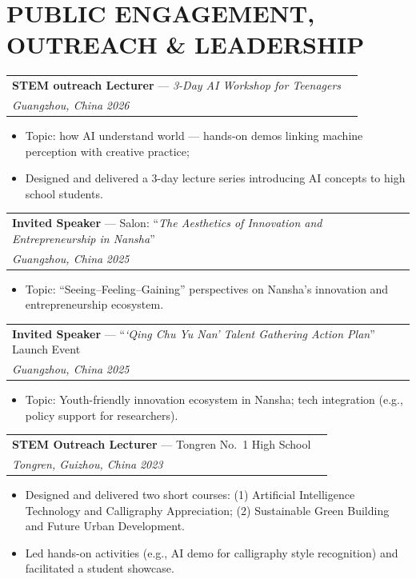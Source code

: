 \section*{PUBLIC ENGAGEMENT, OUTREACH \& LEADERSHIP}

\noindent
\begin{tabularx}{\textwidth}{@{}Xr@{}}
\textbf{STEM outreach Lecturer} — \textit{3-Day AI Workshop for Teenagers} \\
\textit{Guangzhou, China} \hfill \textit{2026}
\end{tabularx}
\begin{itemize}[leftmargin=*]
  \item Topic: how AI understand world --- hands-on demos linking machine
 perception with creative practice;
  \item Designed and delivered a 3-day lecture series introducing AI concepts to high school students.
\end{itemize}

\noindent
\begin{tabularx}{\textwidth}{@{}Xr@{}}
\textbf{Invited Speaker} — Salon: “\textit{The Aesthetics of Innovation and Entrepreneurship in Nansha}” \\
\textit{Guangzhou, China} \hfill \textit{2025}
\end{tabularx}
\begin{itemize}[leftmargin=*]
  \item Topic: “Seeing–Feeling–Gaining” perspectives on Nansha’s innovation and entrepreneurship ecosystem.
\end{itemize}


\noindent
\begin{tabularx}{\textwidth}{@{}Xr@{}}
\textbf{Invited Speaker} — “\textit{‘Qing Chu Yu Nan’ Talent Gathering Action Plan}” Launch Event\\
\textit{Guangzhou, China} \hfill \textit{2025}
\end{tabularx}
\begin{itemize}[leftmargin=*]
  \item Topic: Youth-friendly innovation ecosystem in Nansha; tech integration (e.g., policy support for researchers).
\end{itemize}

\noindent
\begin{tabularx}{\textwidth}{@{}Xr@{}}
\textbf{STEM Outreach Lecturer} — Tongren No.\ 1 High School \\
\textit{Tongren, Guizhou, China} \hfill \textit{2023}
\end{tabularx}
\begin{itemize}[leftmargin=*]
  \item Designed and delivered two short courses: (1) Artificial Intelligence Technology and Calligraphy Appreciation; (2) Sustainable Green Building and Future Urban Development.
  \item Led hands-on activities (e.g., AI demo for calligraphy style recognition) and facilitated a student showcase.
\end{itemize}

